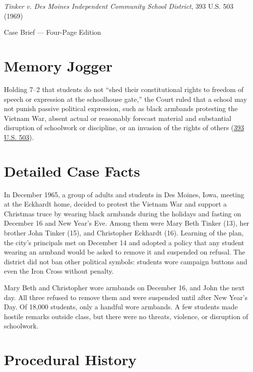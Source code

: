 \documentclass[12pt]{article}
\begin{document}
\begin{center}
{\LARGE \textit{Tinker v. Des Moines Independent Community School District}, 393 U.S. 503 (1969)\par}
\vspace{0.8em}
{\large Case Brief --- Four-Page Edition\par}
\end{center}
\vspace{1em}

\section{Memory Jogger}

Holding 7--2 that students do not ``shed their constitutional rights to freedom of speech or expression at the schoolhouse gate,'' the Court ruled that a school may not punish passive political expression, such as black armbands protesting the Vietnam War, absent actual or reasonably forecast material and substantial disruption of schoolwork or discipline, or an invasion of the rights of others (\href{https://supreme.justia.com/cases/federal/us/393/503/}{393 U.S. 503}).

\section{Detailed Case Facts}

In December 1965, a group of adults and students in Des Moines, Iowa, meeting at the Eckhardt home, decided to protest the Vietnam War and support a Christmas truce by wearing black armbands during the holidays and fasting on December 16 and New Year's Eve. Among them were Mary Beth Tinker (13), her brother John Tinker (15), and Christopher Eckhardt (16). Learning of the plan, the city's principals met on December 14 and adopted a policy that any student wearing an armband would be asked to remove it and suspended on refusal. The district did not ban other political symbols: students wore campaign buttons and even the Iron Cross without penalty.

Mary Beth and Christopher wore armbands on December 16, and John the next day. All three refused to remove them and were suspended until after New Year's Day. Of 18,000 students, only a handful wore armbands. A few students made hostile remarks outside class, but there were no threats, violence, or disruption of schoolwork.

\section{Procedural History}
\end{document}

